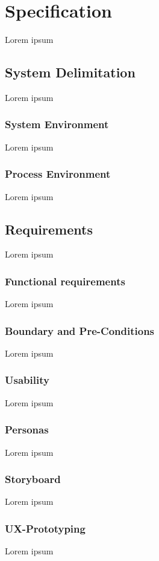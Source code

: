 \section{Specification}
Lorem ipsum

\subsection{System Delimitation}
Lorem ipsum

\subsubsection{System Environment}
Lorem ipsum

\subsubsection{Process Environment}
Lorem ipsum

\subsection{Requirements}
Lorem ipsum

\subsubsection{Functional requirements}
Lorem ipsum

\subsubsection{Boundary and Pre-Conditions}
Lorem ipsum

\subsubsection{Usability}
Lorem ipsum

\subsubsection{Personas}
Lorem ipsum

\subsubsection{Storyboard}
Lorem ipsum

\subsubsection{UX-Prototyping}
Lorem ipsum